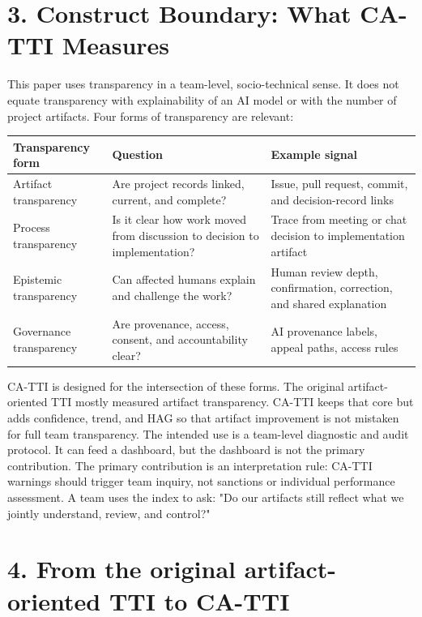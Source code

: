 \documentclass[11pt]{article}
\begin{document}
\section{3. Construct Boundary: What CA-TTI Measures}
This paper uses transparency in a team-level, socio-technical sense. It does not equate transparency with explainability of an AI model or with the number of project artifacts. Four forms of transparency are relevant:
\begin{center}\small
\begin{tabularx}{\linewidth}{Y|Y|Y}
\toprule
Transparency form & Question & Example signal \\
\midrule
Artifact transparency & Are project records linked, current, and complete? & Issue, pull request, commit, and decision-record links \\
Process transparency & Is it clear how work moved from discussion to decision to implementation? & Trace from meeting or chat decision to implementation artifact \\
Epistemic transparency & Can affected humans explain and challenge the work? & Human review depth, confirmation, correction, and shared explanation \\
Governance transparency & Are provenance, access, consent, and accountability clear? & AI provenance labels, appeal paths, access rules \\
\bottomrule
\end{tabularx}
\end{center}
CA-TTI is designed for the intersection of these forms. The original artifact-oriented TTI mostly measured artifact transparency. CA-TTI keeps that core but adds confidence, trend, and HAG so that artifact improvement is not mistaken for full team transparency.
The intended use is a team-level diagnostic and audit protocol. It can feed a dashboard, but the dashboard is not the primary contribution. The primary contribution is an interpretation rule: CA-TTI warnings should trigger team inquiry, not sanctions or individual performance assessment. A team uses the index to ask: "Do our artifacts still reflect what we jointly understand, review, and control?"
\section{4. From the original artifact-oriented TTI to CA-TTI}
\end{document}
